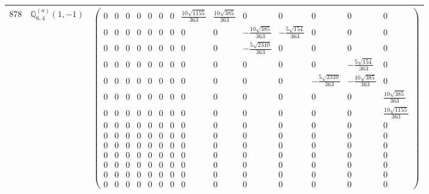 \documentclass[fleqn,8pt,landscape]{jsarticle}
\begin{document}
\begin{center}
\begin{longtable}{ccc}
$ 878 $ & $ \mathbb{Q}_{6,4}^{(a)}(1,-1) $ & $ \begin{pmatrix} 0 & 0 & 0 & 0 & 0 & 0 & 0 & \frac{10 \sqrt{1155}}{363} & \frac{10 \sqrt{385}}{363} & 0 & 0 & 0 & 0 & 0 \\ 0 & 0 & 0 & 0 & 0 & 0 & 0 & 0 & 0 & - \frac{10 \sqrt{385}}{363} & - \frac{5 \sqrt{154}}{363} & 0 & 0 & 0 \\ 0 & 0 & 0 & 0 & 0 & 0 & 0 & 0 & 0 & - \frac{5 \sqrt{2310}}{363} & 0 & 0 & 0 & 0 \\ 0 & 0 & 0 & 0 & 0 & 0 & 0 & 0 & 0 & 0 & 0 & 0 & - \frac{5 \sqrt{154}}{363} & 0 \\ 0 & 0 & 0 & 0 & 0 & 0 & 0 & 0 & 0 & 0 & 0 & - \frac{5 \sqrt{2310}}{363} & - \frac{10 \sqrt{385}}{363} & 0 \\ 0 & 0 & 0 & 0 & 0 & 0 & 0 & 0 & 0 & 0 & 0 & 0 & 0 & \frac{10 \sqrt{385}}{363} \\ 0 & 0 & 0 & 0 & 0 & 0 & 0 & 0 & 0 & 0 & 0 & 0 & 0 & \frac{10 \sqrt{1155}}{363} \\ 0 & 0 & 0 & 0 & 0 & 0 & 0 & 0 & 0 & 0 & 0 & 0 & 0 & 0 \\ 0 & 0 & 0 & 0 & 0 & 0 & 0 & 0 & 0 & 0 & 0 & 0 & 0 & 0 \\ 0 & 0 & 0 & 0 & 0 & 0 & 0 & 0 & 0 & 0 & 0 & 0 & 0 & 0 \\ 0 & 0 & 0 & 0 & 0 & 0 & 0 & 0 & 0 & 0 & 0 & 0 & 0 & 0 \\ 0 & 0 & 0 & 0 & 0 & 0 & 0 & 0 & 0 & 0 & 0 & 0 & 0 & 0 \\ 0 & 0 & 0 & 0 & 0 & 0 & 0 & 0 & 0 & 0 & 0 & 0 & 0 & 0 \\ 0 & 0 & 0 & 0 & 0 & 0 & 0 & 0 & 0 & 0 & 0 & 0 & 0 & 0 \end{pmatrix} $ \\ \hline

\end{longtable}
\end{center}
\end{document}
